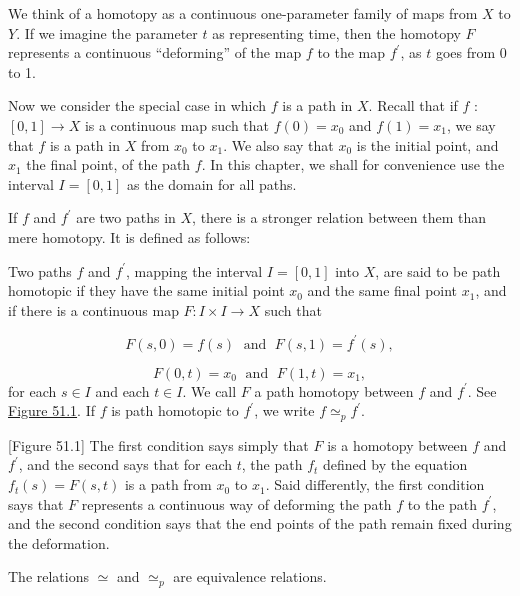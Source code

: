 We think of a homotopy as a continuous one-parameter family of maps from \(X\) to \(Y\). If we imagine the parameter \(t\) as representing time, then the homotopy \(F\) represents a continuous ``deforming'' of the map \(f\) to the map \(f^{\prime }\), as \(t\) goes from 0 to 1.

Now we consider the special case in which \(f\) is a path in \(X\). Recall that if \(f\) : \([ {0,1}] \rightarrow X\) is a continuous map such that \(f( 0) = x_{0}\) and \(f(1) = x_{1}\), we say that \(f\) is a path in \(X\) from \(x_{0}\) to \(x_{1}\). We also say that \(x_{0}\) is the initial point, and \(x_{1}\) the final point, of the path \(f\). In this chapter, we shall for convenience use the interval \(I = [ {0,1}]\) as the domain for all paths.

If \(f\) and \(f^{\prime }\) are two paths in \(X\), there is a stronger relation between them than mere homotopy. It is defined as follows:

\begin{definition}
Two paths \(f\) and \(f^{\prime }\), mapping the interval \(I = [ {0,1}]\) into \(X\), are said to be path homotopic if they have the same initial point \(x_{0}\) and the same final point \(x_{1}\), and if there is a continuous map \(F : I \times I \rightarrow X\) such that

\[
F( {s,0}) = f( s) \;\text{ and }\;F( {s,1}) = f^{\prime }( s),
\]

\[
F( {0,t}) = x_{0}\;\text{ and }\;F( {1,t}) = x_{1},
\]
for each \(s \in I\) and each \(t \in I\). We call \(F\) a path homotopy between \(f\) and \(f^{\prime }\). See \hyperref[fig:51.1]{Figure 51.1}. If \(f\) is path homotopic to \(f^{\prime }\), we write \(f{ \simeq }_{p}f^{\prime }\).
\end{definition}

[Figure 51.1]
The first condition says simply that \(F\) is a homotopy between \(f\) and \(f^{\prime }\), and the second says that for each \(t\), the path \(f_{t}\) defined by the equation \(f_{t}( s) = F( {s,t})\) is a path from \(x_{0}\) to \(x_{1}\). Said differently, the first condition says that \(F\) represents a continuous way of deforming the path \(f\) to the path \(f^{\prime }\), and the second condition says that the end points of the path remain fixed during the deformation.

\begin{lemma}
\label{lem:\thetheorem}
The relations \(\simeq\) and \({ \simeq }_{p}\) are equivalence relations.
\end{lemma}

